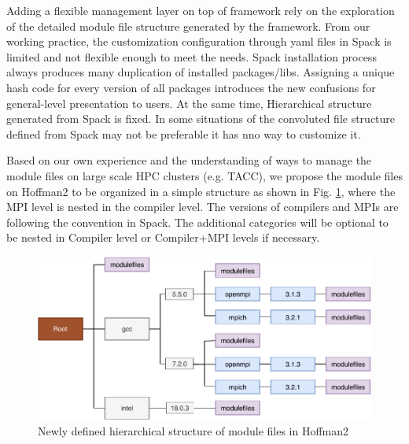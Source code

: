 \documentclass[conference]{IEEEtran}
\begin{document}
Adding a flexible management layer on top of framework rely on the exploration of the detailed module file structure generated by the framework.
From our working practice, the customization configuration through yaml files in Spack is limited and not flexible enough to meet the needs.
Spack installation process always produces many duplication of installed packages/libs. Assigning a unique hash code for every version of all packages introduces the new confusions for general-level presentation to users.
At the same time, Hierarchical structure generated from Spack is fixed. In some situations of the convoluted file structure defined from Spack may not be preferable it has nno way to customize it. 

Based on our own experience and the understanding of ways to manage the module files on large scale HPC clusters (e.g. TACC), we propose the module files on Hoffman2 to be organized in a simple structure as shown in Fig. \ref{fig:h2_new_hier}, where the MPI level is nested in the compiler level. 
The versions of compilers and MPIs are following the convention in Spack. 
The additional categories will be optional to be nested in Compiler level or Compiler+MPI levels if necessary. 

\begin{figure}[htbp]
  \centerline{\includegraphics[width=\linewidth]{figures/h2_new_hier}}
  \caption{Newly defined hierarchical structure of module files in Hoffman2}
  \label{fig:h2_new_hier}
\end{figure}
\end{document}
